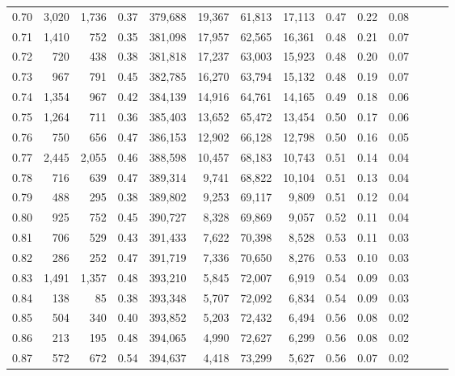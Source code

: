 \begin{tabular}{rrrrrrrrrrrrrr}
0.70 &   3,020 &  1,736 &  0.37 &  379,688 &   19,367 &  61,813 &  17,113 &  0.47 &  0.22 &      0.08 \\
0.71 &   1,410 &    752 &  0.35 &  381,098 &   17,957 &  62,565 &  16,361 &  0.48 &  0.21 &      0.07 \\
0.72 &     720 &    438 &  0.38 &  381,818 &   17,237 &  63,003 &  15,923 &  0.48 &  0.20 &      0.07 \\
0.73 &     967 &    791 &  0.45 &  382,785 &   16,270 &  63,794 &  15,132 &  0.48 &  0.19 &      0.07 \\
0.74 &   1,354 &    967 &  0.42 &  384,139 &   14,916 &  64,761 &  14,165 &  0.49 &  0.18 &      0.06 \\
0.75 &   1,264 &    711 &  0.36 &  385,403 &   13,652 &  65,472 &  13,454 &  0.50 &  0.17 &      0.06 \\
0.76 &     750 &    656 &  0.47 &  386,153 &   12,902 &  66,128 &  12,798 &  0.50 &  0.16 &      0.05 \\
0.77 &   2,445 &  2,055 &  0.46 &  388,598 &   10,457 &  68,183 &  10,743 &  0.51 &  0.14 &      0.04 \\
0.78 &     716 &    639 &  0.47 &  389,314 &    9,741 &  68,822 &  10,104 &  0.51 &  0.13 &      0.04 \\
0.79 &     488 &    295 &  0.38 &  389,802 &    9,253 &  69,117 &   9,809 &  0.51 &  0.12 &      0.04 \\
0.80 &     925 &    752 &  0.45 &  390,727 &    8,328 &  69,869 &   9,057 &  0.52 &  0.11 &      0.04 \\
0.81 &     706 &    529 &  0.43 &  391,433 &    7,622 &  70,398 &   8,528 &  0.53 &  0.11 &      0.03 \\
0.82 &     286 &    252 &  0.47 &  391,719 &    7,336 &  70,650 &   8,276 &  0.53 &  0.10 &      0.03 \\
0.83 &   1,491 &  1,357 &  0.48 &  393,210 &    5,845 &  72,007 &   6,919 &  0.54 &  0.09 &      0.03 \\
0.84 &     138 &     85 &  0.38 &  393,348 &    5,707 &  72,092 &   6,834 &  0.54 &  0.09 &      0.03 \\
0.85 &     504 &    340 &  0.40 &  393,852 &    5,203 &  72,432 &   6,494 &  0.56 &  0.08 &      0.02 \\
0.86 &     213 &    195 &  0.48 &  394,065 &    4,990 &  72,627 &   6,299 &  0.56 &  0.08 &      0.02 \\
0.87 &     572 &    672 &  0.54 &  394,637 &    4,418 &  73,299 &   5,627 &  0.56 &  0.07 &      0.02 \\

\end{tabular}
